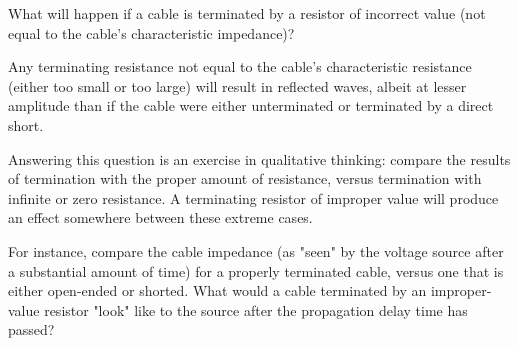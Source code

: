 

What will happen if a cable is terminated by a resistor of incorrect value (not equal to the cable's characteristic impedance)?







Any terminating resistance not equal to the cable's characteristic resistance (either too small or too large) will result in reflected waves, albeit at lesser amplitude than if the cable were either unterminated or terminated by a direct short.







Answering this question is an exercise in qualitative thinking: compare the results of termination with the proper amount of resistance, versus termination with infinite or zero resistance.  A terminating resistor of improper value will produce an effect somewhere between these extreme cases.

For instance, compare the cable impedance (as "seen" by the voltage source after a substantial amount of time) for a properly terminated cable, versus one that is either open-ended or shorted.  What would a cable terminated by an improper-value resistor "look" like to the source after the propagation delay time has passed?




